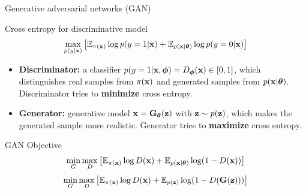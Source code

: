 \begin{frame}{Generative adversarial networks (GAN)}
	\begin{block}{Cross entropy for discriminative model}
		\vspace{-0.3cm}
		\[
			\max_{p(y | \mathbf{x})} \left[\mathbb{E}_{\pi(\mathbf{x})} \log p(y = 1 | \mathbf{x}) + \mathbb{E}_{p(\mathbf{x} | \boldsymbol{\theta})} \log p(y = 0 | \mathbf{x}) \right] 
		\]
	\end{block}
	\begin{itemize}
		\item \textbf{Discriminator:} a classifier $p(y = 1 | \mathbf{x}, \boldsymbol{\phi}) = D_{\boldsymbol{\phi}}(\mathbf{x}) \in [0, 1]$, which distinguishes real samples from $\pi(\mathbf{x})$ and  generated samples from $p(\mathbf{x} | \boldsymbol{\theta})$. Discriminator tries to \textbf{minimize} cross entropy.
		\item \textbf{Generator:} generative model $\mathbf{x} = \mathbf{G}_{\boldsymbol{\theta}}(\mathbf{z})$ with $\mathbf{z} \sim p(\mathbf{z})$, which makes the generated sample more realistic. Generator tries to \textbf{maximize} cross entropy.
	\end{itemize}
	\begin{block}{GAN Objective}
		\vspace{-0.5cm}
		\[
			\min_{G} \max_D \left[ \mathbb{E}_{\pi(\mathbf{x})} \log D(\mathbf{x}) + \mathbb{E}_{p(\mathbf{x} | \boldsymbol{\theta})} \log (1 - D(\mathbf{x})) \right] 
		\]
		\[
			\min_{G} \max_D \left[ \mathbb{E}_{\pi(\mathbf{x})} \log D(\mathbf{x}) + \mathbb{E}_{p(\mathbf{z})} \log (1 - D(\mathbf{G}(\mathbf{z}))) \right]
		\]
	\end{block}
\end{frame}
